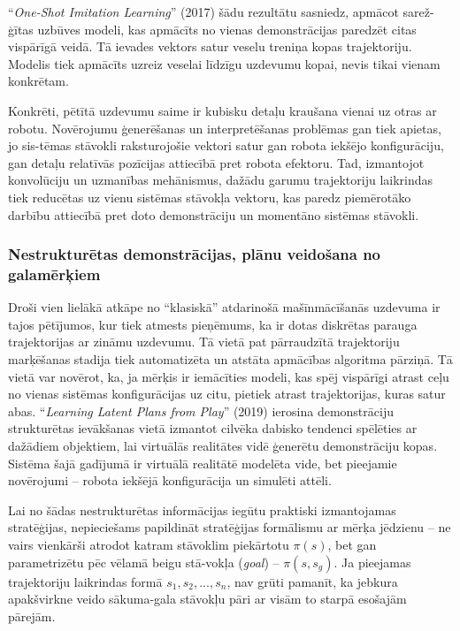 \documentclass[12pt, a4paper]{article}
\numberwithin{equation}{section} %
\begin{document}
``\textit{One-Shot Imitation Learning}'' \cite{duan2017one} (2017) šādu rezultātu sasniedz, apmācot sarež-ģītas uzbūves modeli, kas apmācīts no vienas demonstrācijas paredzēt citas vispārīgā veidā. Tā ievades vektors satur veselu treniņa kopas trajektoriju. Modelis tiek apmācīts uzreiz veselai līdzīgu uzdevumu kopai, nevis tikai vienam konkrētam.

Konkrēti, pētītā uzdevumu saime ir kubisku detaļu kraušana vienai uz otras ar robotu. Novērojumu ģenerēšanas un interpretēšanas problēmas gan tiek apietas, jo sis-tēmas stāvokli raksturojošie vektori satur gan robota iekšējo konfigurāciju, gan detaļu relatīvās pozīcijas attiecībā pret robota efektoru. Tad, izmantojot konvolūciju un uzmanības mehānismus, dažādu garumu trajektoriju laikrindas tiek reducētas uz vienu sistēmas stāvokļa vektoru, kas paredz piemērotāko darbību attiecībā pret doto demonstrāciju un momentāno sistēmas stāvokli.

\subsubsection{Nestrukturētas demonstrācijas, plānu veidošana no galamērķiem}

Droši vien lielākā atkāpe no ``klasiskā'' atdarinošā mašīnmācīšanās uzdevuma ir tajos pētījumos, kur tiek atmests pieņēmums, ka ir dotas diskrētas parauga trajektorijas ar zināmu uzdevumu. Tā vietā pat pārraudzītā trajektoriju marķēšanas stadija tiek automatizēta un atstāta apmācības algoritma pārziņā. Tā vietā var novērot, ka, ja mērķis ir iemācīties modeli, kas spēj vispārīgi atrast ceļu no vienas sistēmas konfigurācijas uz citu, pietiek atrast trajektorijas, kuras satur abas. ``\textit{Learning Latent Plans from Play}'' \cite{lynch2020learning} (2019) ierosina demonstrāciju strukturētas ievākšanas vietā izmantot cilvēka dabisko tendenci spēlēties ar dažādiem objektiem, lai virtuālās realitātes vidē ģenerētu demonstrāciju kopas. Sistēma šajā gadījumā ir virtuālā realitātē modelēta vide, bet pieejamie novērojumi -- robota iekšējā konfigurācija un simulēti attēli.

Lai no šādas nestrukturētas informācijas iegūtu praktiski izmantojamas stratēģijas, nepieciešams papildināt stratēģijas formālismu ar mērķa jēdzienu -- ne vairs vienkārši atrodot katram stāvoklim piekārtotu $\pi(s)$, bet gan parametrizētu pēc vēlamā beigu stā-vokļa (\textit{goal}) -- $\pi(s,s_{g})$. Ja pieejamas trajektoriju laikrindas formā $s_1, s_2, ..., s_n$, nav grūti pamanīt, ka jebkura apakšvirkne veido sākuma-gala stāvokļu pāri ar visām to starpā esošajām pārejām.
\end{document}
